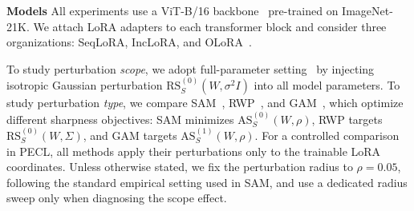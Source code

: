 \documentclass{article}
\theoremstyle{plain}
\theoremstyle{definition}
\theoremstyle{remark}
\begin{document}
\noindent\textbf{Models}\quad 
All experiments use a ViT-B/16 backbone~\cite{dosovitskiy2020image} pre-trained on ImageNet-21K.
We attach LoRA adapters to each transformer block and consider three organizations: SeqLoRA, IncLoRA, and OLoRA~\cite{wang2023orthogonal}.






To study perturbation \emph{scope}, we adopt {full-parameter} setting~\cite{li2024flatlora} by injecting isotropic Gaussian perturbation $\mathrm{RS}_S^{(0)}({W}, \sigma^2 
I)$ into all model parameters.
To study perturbation \emph{type}, we compare SAM~\cite{foretSharpnessAwareMinimizationEfficiently2021}, RWP~\cite{pmlr-v151-bisla22a}, and GAM~\cite{Zhang_GAM}, which optimize different sharpness objectives: SAM minimizes $\mathrm{AS}^{(0)}_S(W,\rho)$, RWP targets $\mathrm{RS}^{(0)}_S(W,\Sigma)$, and GAM targets $\mathrm{AS}^{(1)}_S(W,\rho)$. For a controlled comparison in PECL, all methods apply their perturbations only to the trainable LoRA coordinates.
Unless otherwise stated, we fix the perturbation radius to $\rho=0.05$, following the standard empirical setting used in SAM, and use a dedicated radius sweep only when diagnosing the scope effect.
\end{document}
